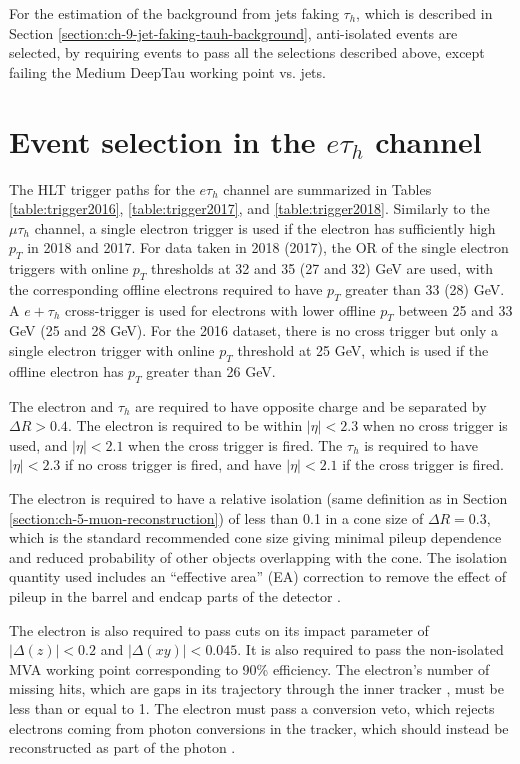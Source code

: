 For the estimation of the background from jets faking $\tau_{h}$, which is described in Section \ref{section:ch-9-jet-faking-tauh-background}, anti-isolated events are selected, by requiring events to pass all the selections described above, except failing the Medium DeepTau working point vs. jets.

\section{Event selection in the $e\tau_{h}$ channel}
\label{section:ch-7-event-selection-etau}

The HLT trigger paths for the $e\tau_{h}$ channel are summarized in Tables \ref{table:trigger2016}, \ref{table:trigger2017}, and \ref{table:trigger2018}. Similarly to the $\mu\tau_{h}$ channel, a single electron trigger is used if the electron has sufficiently high $p_{T}$ in 2018 and 2017. For data taken in 2018 (2017), the OR of the single electron triggers with online $p_{T}$ thresholds at 32 and 35 (27 and 32) GeV are used, with the corresponding offline electrons required to have $p_{T}$ greater than 33 (28) GeV. A $e + \tau_{h}$ cross-trigger is used for electrons with lower offline $p_{T}$ between 25 and 33 GeV (25 and 28 GeV). For the 2016 dataset, there is no cross trigger but only a single electron trigger with online $p_{T}$ threshold at 25 GeV, which is used if the offline electron has $p_{T}$ greater than 26 GeV.

The electron and $\tau_h$ are required to have opposite charge and be separated by $\Delta R > 0.4$. The electron is required to be within $|\eta| < 2.3$ when no cross trigger is used, and $|\eta| < 2.1$ when the cross trigger is fired. The $\tau_{h}$ is required to have $|\eta| < 2.3$ if no cross trigger is fired, and have $|\eta| < 2.1$ if the cross trigger is fired.

The electron is required to have a relative isolation (same definition as in Section \ref{section:ch-5-muon-reconstruction}) of less than 0.1 in a cone size of $\Delta R = 0.3$, which is the standard recommended cone size giving minimal pileup dependence and reduced probability of other objects overlapping with the cone. The isolation quantity used includes an ``effective area'' (EA) correction to remove the effect of pileup in the barrel and endcap parts of the detector \cite{twiki_EGamma_cutbased_ID_info}.

The electron is also required to pass cuts on its impact parameter of $|\Delta(z)| < 0.2$ and $|\Delta(xy)| < 0.045$. It is also required to pass the non-isolated MVA working point corresponding to 90\% efficiency. The electron's number of missing hits, which are gaps in its trajectory through the inner tracker \cite{twiki_EGamma_cutbased_ID_info}, must be less than or equal to 1. The electron must pass a conversion veto, which rejects electrons coming from photon conversions in the tracker, which should instead be reconstructed as part of the photon \cite{twiki_EGamma_cutbased_ID_info}.

